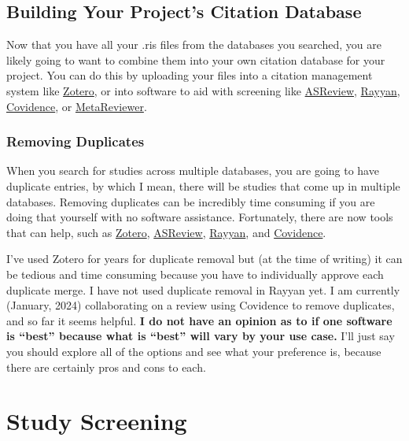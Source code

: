 \documentclass[
]{book}
\begin{document}
\hypertarget{building-your-projects-citation-database}{%
\section{Building Your Project's Citation Database}\label{building-your-projects-citation-database}}

Now that you have all your .ris files from the databases you searched, you are likely going to want to combine them into your own citation database for your project. You can do this by uploading your files into a citation management system like \href{https://www.zotero.org/}{Zotero}, or into software to aid with screening like \href{https://asreview.nl/}{ASReview}, \href{https://www.rayyan.ai/}{Rayyan}, \href{https://www.covidence.org/}{Covidence}, or \href{https://www.metareviewer.org/}{MetaReviewer}.

\hypertarget{removing-duplicates}{%
\subsection{Removing Duplicates}\label{removing-duplicates}}

When you search for studies across multiple databases, you are going to have duplicate entries, by which I mean, there will be studies that come up in multiple databases. Removing duplicates can be incredibly time consuming if you are doing that yourself with no software assistance. Fortunately, there are now tools that can help, such as \href{https://www.zotero.org/}{Zotero}, \href{https://asreview.nl/}{ASReview}, \href{https://www.rayyan.ai/}{Rayyan}, and \href{https://www.covidence.org/}{Covidence}.

I've used Zotero for years for duplicate removal but (at the time of writing) it can be tedious and time consuming because you have to individually approve each duplicate merge. I have not used duplicate removal in Rayyan yet. I am currently (January, 2024) collaborating on a review using Covidence to remove duplicates, and so far it seems helpful. \textbf{I do not have an opinion as to if one software is ``best'' because what is ``best'' will vary by your use case.} I'll just say you should explore all of the options and see what your preference is, because there are certainly pros and cons to each.

\hypertarget{screening}{%
\chapter{Study Screening}\label{screening}}
\end{document}
